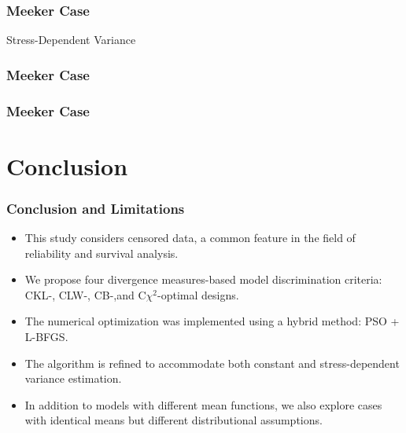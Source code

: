 \documentclass[xcolor=dvipsnames,aspectratio=1610]{beamer}
\begin{document}
\begin{frame}
\frametitle{Meeker Case}
Stress-Dependent Variance

\begin{figure}
\end{figure}

\end{frame}



\begin{frame}
\frametitle{Meeker Case}

\begin{figure}
\end{figure}

\end{frame}


\begin{frame}
\frametitle{Meeker Case}
\begin{figure}[H]
\centering
{}
\end{figure}
\end{frame}


\section{Conclusion}
\begin{frame}
\frametitle{Conclusion and Limitations}

\begin{itemize}
\item This study considers censored data, a common feature in the field of reliability and survival analysis.
\item We propose four divergence measures-based model discrimination criteria:
CKL-, CLW-, CB-,and C$\chi^2$-optimal designs.
\item The numerical optimization was implemented using a hybrid method: PSO + L-BFGS.
\item The algorithm is refined to accommodate both constant and stress-dependent variance estimation.
\item In addition to models with different mean functions, we also explore cases with identical means but different distributional assumptions.
\end{itemize}
\end{frame}
\end{document}
